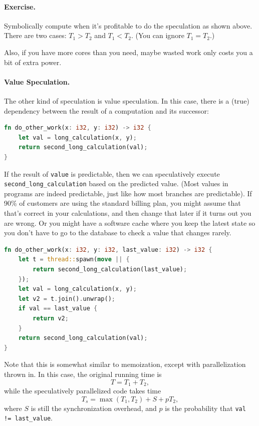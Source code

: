 \paragraph{Exercise.} Symbolically compute when it's profitable to do the
speculation as shown above. There are two cases: $T_1 > T_2$ and $T_1
< T_2$. (You can ignore $T_1 = T_2$.)

Also, if you have more cores than you need, maybe wasted work only costs you a bit of extra power.

\paragraph{Value Speculation.}
The other kind of speculation is value speculation. In this case,
there is a (true) dependency between the result of a computation 
and its successor:

\begin{lstlisting}[language=Rust]
fn do_other_work(x: i32, y: i32) -> i32 {
    let val = long_calculation(x, y);
    return second_long_calculation(val);
}
\end{lstlisting}

If the result of {\tt value} is predictable, then we can speculatively
execute {\tt second\_long\_calculation} based on the predicted value.
(Most values in programs are indeed predictable, just like how most branches are predictable). If 90\% of customers are using the standard billing plan, you might assume that that's correct in your calculations, and then change that later if it turns out you are wrong. Or you might have a software cache where you keep the latest state so you don't have to go to the database to check a value that changes rarely. 

\begin{lstlisting}[language=Rust]
fn do_other_work(x: i32, y: i32, last_value: i32) -> i32 {
    let t = thread::spawn(move || {
        return second_long_calculation(last_value);
    });
    let val = long_calculation(x, y);
    let v2 = t.join().unwrap();
    if val == last_value {
        return v2;
    }
    return second_long_calculation(val);
}
\end{lstlisting}

Note that this is somewhat similar to memoization, except with 
parallelization thrown in. In this case, the original running time is
\[ T = T_1 + T_2, \]
while the speculatively parallelized code takes time
\[ T_s = \max(T_1, T_2) + S + pT_2,\]
where $S$ is still the synchronization overhead, and $p$ is the probability that
\verb+val != last_value+.

